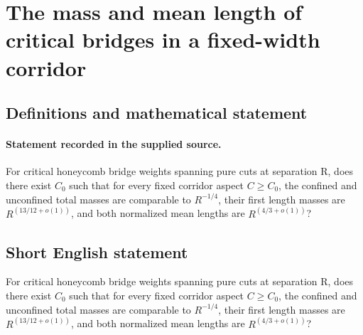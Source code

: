 \documentclass[11pt]{article}
\begin{document}
\section*{The mass and mean length of critical bridges in a fixed-width corridor}\label{30007366}
\subsection{Definitions and mathematical statement}
\paragraph{Statement recorded in the supplied source.}
For critical honeycomb bridge weights spanning pure cuts at separation R, does there exist $C_0$ such that for every fixed corridor aspect $C\geq C_0$, the confined and unconfined total masses are comparable to $R^{-1/4}$, their first length masses are $R^(13/12+o(1))$, and both normalized mean lengths are $R^(4/3+o(1))$?
\subsection{Short English statement}
For critical honeycomb bridge weights spanning pure cuts at separation R, does there exist $C_0$ such that for every fixed corridor aspect $C\geq C_0$, the confined and unconfined total masses are comparable to $R^{-1/4}$, their first length masses are $R^(13/12+o(1))$, and both normalized mean lengths are $R^(4/3+o(1))$?
\end{document}
